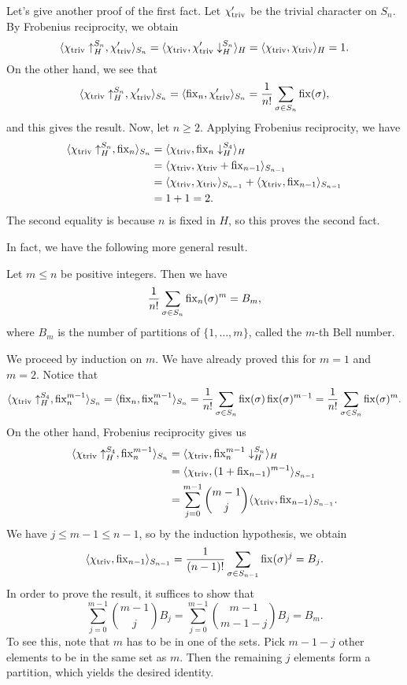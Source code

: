 Let's give another proof of the first fact. Let $\chi'_{\operatorname{triv}}$ be the trivial 
character on $S_n$. By Frobenius reciprocity, we obtain 
\[ \langle \chi_{\operatorname{triv}} \uparrow_H^{S_n}, \chi'_{\operatorname{triv}} \rangle_{S_n} 
= \langle \chi_{\operatorname{triv}}, \chi'_{\operatorname{triv}} \downarrow_H^{S_n} \rangle_H 
= \langle \chi_{\operatorname{triv}}, \chi_{\operatorname{triv}} \rangle_H = 1. \]
On the other hand, we see that 
\[ \langle \chi_{\operatorname{triv}} \uparrow_H^{S_n}, \chi'_{\operatorname{triv}} \rangle_{S_n} 
= \langle \operatorname{fix}_n, \chi'_{\operatorname{triv}} \rangle_{S_n} = \frac{1}{n!} \sum_{\sigma \in S_n} 
\operatorname{fix}(\sigma), \] 
and this gives the result. Now, let $n \geq 2$. Applying Frobenius reciprocity, 
we have 
\begin{align*}
    \langle \chi_{\operatorname{triv}} \uparrow_H^{S_n}, \operatorname{fix}_n \rangle_{S_n} 
    &= \langle \chi_{\operatorname{triv}}, \operatorname{fix}_n \downarrow_H^{S_4} \rangle_H \\ 
    &= \langle \chi_{\operatorname{triv}}, \chi_{\operatorname{triv}} + \operatorname{fix}_{n-1} \rangle_{S_{n-1}} \\ 
    &= \langle \chi_{\operatorname{triv}}, \chi_{\operatorname{triv}} \rangle_{S_{n-1}} 
    + \langle \chi_{\operatorname{triv}}, \operatorname{fix}_{n-1} \rangle_{S_{n-1}} \\ 
    &= 1 + 1 = 2. 
\end{align*}
The second equality is because $n$ is fixed in $H$, so this proves the second fact. 

In fact, we have the following more general result. 

\begin{prop}{}
    Let $m \leq n$ be positive integers. Then we have 
    \[ \frac{1}{n!} \sum_{\sigma \in S_n} \operatorname{fix}_n(\sigma)^m = B_m, \] 
    where $B_m$ is the number of partitions of $\{1, \dots, m\}$, called the 
    $m$-th Bell number. 
\end{prop}
\begin{pf}
    We proceed by induction on $m$. We have already proved this for $m = 1$ 
    and $m = 2$. Notice that 
    \[ \langle \chi_{\operatorname{triv}} \uparrow_H^{S_4}, \operatorname{fix}_n^{m-1} \rangle_{S_n} 
    = \langle \operatorname{fix}_n, \operatorname{fix}_n^{m-1} \rangle_{S_n} = \frac{1}{n!} 
    \sum_{\sigma \in S_n} \operatorname{fix}(\sigma) \operatorname{fix}(\sigma)^{m-1} 
    = \frac{1}{n!} \sum_{\sigma \in S_n} \operatorname{fix}(\sigma)^m. \] 
    On the other hand, Frobenius reciprocity gives us 
    \begin{align*}
        \langle \chi_{\operatorname{triv}} \uparrow_H^{S_4}, \operatorname{fix}_n^{m-1} \rangle_{S_n} 
        &= \langle \chi_{\operatorname{triv}}, \operatorname{fix}_n^{m-1} \downarrow_H^{S_n} \rangle_H \\
        &= \langle \chi_{\operatorname{triv}}, (1 + \operatorname{fix}_{n-1})^{m-1} \rangle_{S_{n-1}} \\
        &= \sum_{j=0}^{m-1} \binom{m-1}{j} \langle \chi_{\operatorname{triv}}, \operatorname{fix}_{n-1} \rangle_{S_{n-1}}. 
    \end{align*}
    We have $j \leq m-1 \leq n-1$, so by the induction hypothesis, we obtain 
    \[ \langle \chi_{\operatorname{triv}}, \operatorname{fix}_{n-1} \rangle_{S_{n-1}} 
    = \frac{1}{(n-1)!} \sum_{\sigma \in S_{n-1}} \operatorname{fix}(\sigma)^j = B_j. \] 
    In order to prove the result, it suffices to show that 
    \[ \sum_{j=0}^{m-1} \binom{m-1}{j} B_j = \sum_{j=0}^{m-1} \binom{m-1}{m-1-j} B_j = B_m. \] 
    To see this, note that $m$ has to be in one of the sets. Pick $m - 1 - j$ 
    other elements to be in the same set as $m$. Then the remaining $j$ 
    elements form a partition, which yields the desired identity. 
\end{pf}
